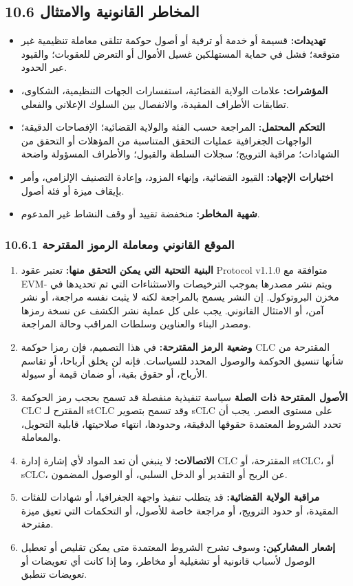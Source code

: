 \documentclass[11pt]{article}
\begin{document}
\subsection*{10.6 المخاطر القانونية والامتثال}

\begin{itemize}[leftmargin=*]
\item \textbf{تهديدات:} قسيمة أو خدمة أو ترقية أو أصول حوكمة تتلقى معاملة تنظيمية غير متوقعة؛ فشل في حماية المستهلكين غسيل الأموال أو التعرض للعقوبات؛ والقيود عبر الحدود.
\item \textbf{المؤشرات:} علامات الولاية القضائية، استفسارات الجهات التنظيمية، الشكاوى، تطابقات الأطراف المقيدة، والانفصال بين السلوك الإعلاني والفعلي.
\item \textbf{التحكم المحتمل:} المراجعة حسب الفئة والولاية القضائية؛ الإفصاحات الدقيقة؛ الواجهات الجغرافية عمليات التحقق المتناسبة من المؤهلات أو التحقق من الشهادات؛ مراقبة الترويج؛ سجلات السلطة والقبول؛ والأطراف المسؤولة واضحة
\item \textbf{اختبارات الإجهاد:} القيود القضائية، وإنهاء المزود، وإعادة التصنيف الإلزامي، وأمر بإيقاف ميزة أو فئة أصول.
\item \textbf{شهية المخاطر:} منخفضة تقييد أو وقف النشاط غير المدعوم.
\end{itemize}
\subsubsection*{10.6.1 الموقع القانوني ومعاملة الرموز المقترحة}

\begin{enumerate}[leftmargin=*]
\item \textbf{البنية التحتية التي يمكن التحقق منها:} تعتبر عقود Protocol v1.1.0 متوافقة مع EVM- ويتم نشر مصدرها بموجب الترخيصات والاستثناءات التي تم تحديدها في مخزن البروتوكول. إن النشر يسمح بالمراجعة لكنه لا يثبت نفسه مراجعة، أو نشر آمن، أو الامتثال القانوني. يجب على كل عملية نشر الكشف عن نسخة رمزها ومصدر البناء والعناوين وسلطات المراقب وحالة المراجعة.
\item \textbf{وضعية الرمز المقترحة:} في هذا التصميم، فإن رمزا حوكمة CLC المقترحة من شأنها تنسيق الحوكمة والوصول المحدد للسياسات. فإنه لن يخلق أرباحا، أو تقاسم الأرباح، أو حقوق بقية، أو ضمان قيمة أو سيولة.
\item \textbf{الأصول المقترحة ذات الصلة} سياسة تنفيذية منفصلة قد تسمح بحجب رمز الحوكمة CLC المقترح لـ stCLC وقد تسمح بتصوير sCLC على مستوى العصر. يجب أن تحدد الشروط المعتمدة حقوقها الدقيقة، وحدودها، انتهاء صلاحيتها، قابلية التحويل، والمعاملة.
\item \textbf{الاتصالات:} لا ينبغي أن تعد المواد لأي إشارة إدارة CLC المقترحة، أو stCLC، أو sCLC، عن الربح أو التقدير أو الدخل السلبي، أو الوصول المضمون.
\item \textbf{مراقبة الولاية القضائية:} قد يتطلب تنفيذ واجهة الجغرافيا، أو شهادات للفئات المقيدة، أو حدود الترويج، أو مراجعة خاصة للأصول، أو التحكمات التي تعيق ميزة مقترحة.
\item \textbf{إشعار المشاركين:} وسوف تشرح الشروط المعتمدة متى يمكن تقليص أو تعطيل الوصول لأسباب قانونية أو تشغيلية أو مخاطر، وما إذا كانت أي تعويضات أو تعويضات تنطبق.
\end{enumerate}
\end{document}
